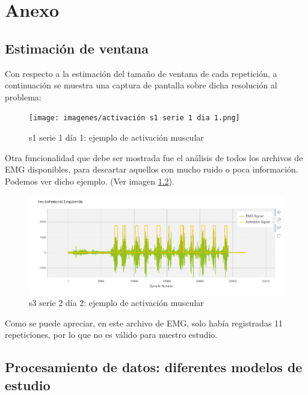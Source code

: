 \chapter{Anexo}

\section{Estimación de ventana \label{anexo ventana}}

    Con respecto a la estimación del tamaño de ventana de cada repetición, a continuación se muestra una captura de pantalla sobre dicha resolución al problema:
    
    \begin{figure}[ht]
    \centering
    \texttt{[image: imagenes/activación s1 serie 1 dia 1.png]}
    \caption{ s1 serie 1 día 1: ejemplo de activación muscular}
    \label{fig:s1 serie 1 dia 1}
    \end{figure}
    
    Otra funcionalidad que debe ser mostrada fue el análisis de todos los archivos de EMG disponibles, para descartar aquellos con mucho ruido o poca información. 
    Podemos ver dicho ejemplo. (Ver imagen \ref{fig:s1 serie 1 dia 1 error}).
    
    \begin{figure}[ht]
    \centering
    \includegraphics[width=1.0\textwidth]{imagenes/s3 serie 2 dia 2.png}
    \caption{ s3 serie 2 día 2: ejemplo de activación muscular}
    \label{fig:s1 serie 1 dia 1 error}
    \end{figure}
    
    Como se puede apreciar, en este archivo de EMG, solo había registradas 11 repeticiones, por lo que no es válido para nuestro estudio.



\section{Procesamiento de datos: diferentes modelos de estudio \label{anexo modelos}}

